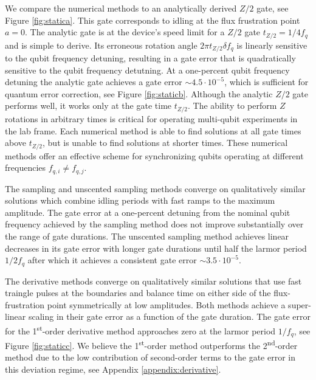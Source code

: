 We compare the numerical methods
to an analytically derived $Z/2$ gate, see Figure \ref{fig:statica}. 
This gate corresponds to
idling at the flux frustration point $a = 0$. The analytic gate
is at the device's speed limit for a $Z/2$ gate $t_{Z/2} = 1 / 4 f_{q}$ and
is simple to derive. Its erroneous rotation angle $2 \pi t_{Z/2} \delta f_{q}$ is linearly sensitive to
the qubit frequency detuning, resulting in a gate error that is quadratically sensitive
to the qubit frequency detutning.
At a one-percent
qubit frequency detuning the analytic gate achieves a gate error $\sim 4.5 \cdot 10^{-5}$,
which is sufficient for quantum error correction, see Figure \ref{fig:staticb}.
Although the analytic $Z/2$ gate performs well, it works
only at the gate time $t_{Z/2}$. The ability to perform $Z$ rotations in arbitrary times is critical
for operating multi-qubit experiments in the lab frame.
Each numerical method is able to find solutions at
all gate times above $t_{Z/2}$, but is unable to find solutions at shorter times.
These numerical methods offer an effective scheme for synchronizing
qubits operating at different frequencies $f_{q, i} \neq f_{q, j}$.

The sampling and unscented sampling methods
converge on qualitatively similar solutions which combine idling periods
with fast ramps to the maximum amplitude. The gate error at a one-percent
detuning from the nominal qubit frequency achieved
by the sampling method does not improve substantially over the
range of gate durations. The unscented sampling method
achieves linear decreases in its gate error with longer gate durations
until half the larmor period $1 / 2 f_{q}$ after which it achieves a consistent
gate error $\sim 3.5 \cdot 10^{-5}$.

The derivative methods converge on qualitatively similar solutions that
use fast traingle pulses at the boundaries and balance time
on either side of the flux-frustration point symmetrically at low amplitudes.
Both methods achieve a super-linear scaling in their gate error as
a function of the gate duration. The gate error for the 1\textsuperscript{st}-order
derivative method approaches zero at the larmor period $1 / f_{q}$, see Figure \ref{fig:staticc}.
We believe the 1\textsuperscript{st}-order method outperforms the 2\textsuperscript{nd}-order
method due to the low contribution of second-order
terms to the gate error in this deviation regime, see Appendix \ref{appendix:derivative}.

